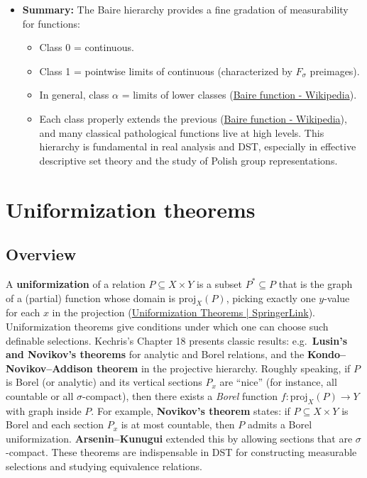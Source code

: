 \documentclass[11pt]{article}
\begin{document}
\begin{itemize}
\item \textbf{Summary:} The Baire hierarchy provides a fine gradation of
measurability for functions:

\begin{itemize}
\item Class 0 = continuous.
\item Class 1 = pointwise limits of continuous (characterized by
\(F_\sigma\) preimages).
\item In general, class \(\alpha\) = limits of lower classes
(\href{https://en.wikipedia.org/wiki/Baire\_function\#:\~:text=,Baire\%20class\%20less\%20than\%20\%CE\%B1}{Baire
function - Wikipedia}).
\item Each class properly extends the previous
(\href{https://en.wikipedia.org/wiki/Baire\_function\#:\~:text=Baire\%20class\%20of\%20a\%20countable,not\%20in\%20any\%20Baire\%20class}{Baire
function - Wikipedia}), and many classical pathological functions
live at high levels. This hierarchy is fundamental in real analysis
and DST, especially in effective descriptive set theory and the
study of Polish group representations.
\end{itemize}
\end{itemize}
\section{Uniformization theorems}
\label{uniformization-theorems}
\subsection{Overview}
\label{overview-8}
A \textbf{uniformization} of a relation \(P\subseteq X\times Y\) is a subset
\(P^*\subseteq P\) that is the graph of a (partial) function whose
domain is \(\mathrm{proj}_X(P)\), picking exactly one \(y\)-value for
each \(x\) in the projection
(\href{https://link.springer.com/content/pdf/10.1007/978-1-4612-4190-4\_18\#:\~:text=Given\%20two\%20sets\%20X\%2C\%20Y,a\%20uniformizing\%20function\%20for\%20P}{Uniformization
Theorems | SpringerLink}). Uniformization theorems give conditions
under which one can choose such definable selections. Kechris's Chapter
18 presents classic results: e.g. \textbf{Lusin's and Novikov's theorems} for
analytic and Borel relations, and the \textbf{Kondo--Novikov--Addison theorem}
in the projective hierarchy. Roughly speaking, if \(P\) is Borel (or
analytic) and its vertical sections \(P_x\) are “nice” (for instance,
all countable or all \(\sigma\)-compact), then there exists a \emph{Borel}
function \(f: \mathrm{proj}_X(P)\to Y\) with graph inside \(P\). For
example, \textbf{Novikov's theorem} states: if \(P\subseteq X\times Y\) is
Borel and each section \(P_x\) is at most countable, then \(P\) admits a
Borel uniformization. \textbf{Arsenin--Kunugui} extended this by allowing
sections that are \(\sigma\)-compact. These theorems are indispensable
in DST for constructing measurable selections and studying equivalence
relations.
\end{document}
